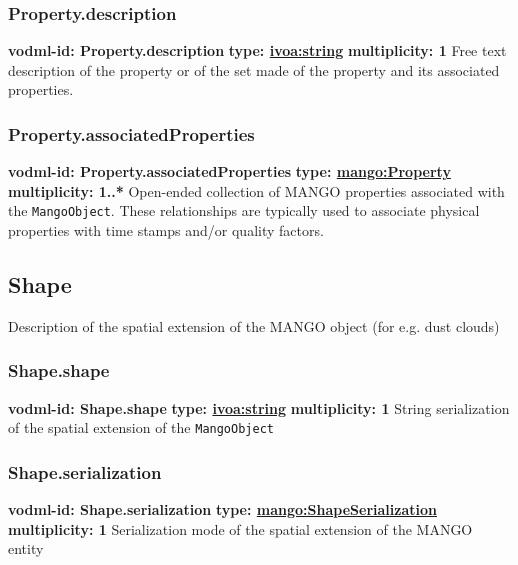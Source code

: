     \subsubsection{Property.description}
      \textbf{vodml-id: Property.description} \newline
      \textbf{type: \hyperref[sect:ivoa]{ivoa:string}} \newline
      \textbf{multiplicity: 1} \newline
      Free text description of the property or of the set made of the property and its associated properties.

    \subsubsection{Property.associatedProperties}
      \textbf{vodml-id: Property.associatedProperties} \newline
      \textbf{type: \hyperref[sect:Property]{mango:Property}} \newline
      \textbf{multiplicity: 1..*} \newline
      Open-ended collection of MANGO properties associated with the \texttt{MangoObject}. These relationships are typically used to associate physical properties with time stamps and/or quality factors.

  \subsection{Shape}
  \label{sect:Shape}
    Description of the spatial extension of the MANGO object (for e.g. dust clouds)

    \subsubsection{Shape.shape}
      \textbf{vodml-id: Shape.shape} \newline
      \textbf{type: \hyperref[sect:ivoa]{ivoa:string}} \newline
      \textbf{multiplicity: 1} \newline
      String serialization of the spatial extension of the \texttt{MangoObject}

    \subsubsection{Shape.serialization}
      \textbf{vodml-id: Shape.serialization} \newline
      \textbf{type: \hyperref[sect:ShapeSerialization]{mango:ShapeSerialization}} \newline
      \textbf{multiplicity: 1} \newline
      Serialization mode of the spatial extension of the MANGO entity

